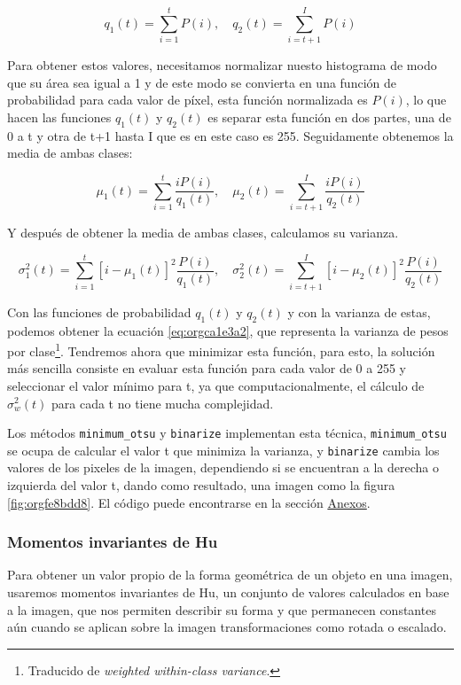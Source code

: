 \documentclass[letter]{article}
\begin{document}
$$ q_1(t) = \sum_{i=1}^t P(i), \quad q_2(t) = \sum_{i=t+1}^I P(i) $$

Para obtener estos valores, necesitamos normalizar nuesto histograma de modo que
su área sea igual a 1 y de este modo se convierta en una función de probabilidad
para cada valor de píxel, esta función normalizada es \(P(i)\), lo que hacen las
funciones \(q_1(t)\) y \(q_2(t)\) es separar esta función en dos partes, una de 0 a
t y otra de t+1 hasta I que es en este caso es 255. Seguidamente obtenemos la
media de ambas clases:

$$ \mu_1(t) = \sum_{i=1}^t \frac{i P(i)}{q_1(t)} , \quad \mu_2(t) = \sum_{i=t+1}^I \frac{i P(i)}{q_2(t)} $$

Y después de obtener la media de ambas clases, calculamos su varianza.

$$ \sigma_1^2(t) = \sum_{i=1}^t [i-\mu_1(t)]^2 \frac{P(i)}{q_1(t)} , \quad \sigma_2^2(t) = \sum_{i=t+1}^I [i-\mu_2(t)]^2 \frac{P(i)}{q_2(t)} $$

Con las funciones de probabilidad \(q_1(t)\) y \(q_2(t)\) y con la varianza de
estas, podemos obtener la ecuación \ref{eq:orgca1e3a2}, que representa la varianza de
pesos por clase\footnote{Traducido de \emph{weighted within-class variance}.}. Tendremos ahora que minimizar esta función,
para esto, la solución más sencilla consiste en evaluar esta función para cada
valor de 0 a 255 y seleccionar el valor mínimo para t, ya que
computacionalmente, el cálculo de \(\sigma_w^2(t)\) para cada t no tiene mucha
complejidad.

Los métodos \texttt{minimum\_otsu} y \texttt{binarize} implementan esta técnica, \texttt{minimum\_otsu}
se ocupa de calcular el valor t que minimiza la varianza, y \texttt{binarize} cambia
los valores de los pixeles de la imagen, dependiendo si se encuentran a la
derecha o izquierda del valor t, dando como resultado, una imagen como la figura
\ref{fig:orgfe8bdd8}. El código puede encontrarse en la sección \hyperref[sec:orgdfb6bfe]{Anexos}.

\subsubsection{Momentos invariantes de Hu}
\label{sec:orgfcc6a39}
Para obtener un valor propio de la forma geométrica de un objeto en una imagen,
usaremos momentos invariantes de Hu, un conjunto de valores calculados en base a
la imagen, que nos permiten describir su forma y que permanecen constantes aún
cuando se aplican sobre la imagen transformaciones como rotada o escalado.
\end{document}
